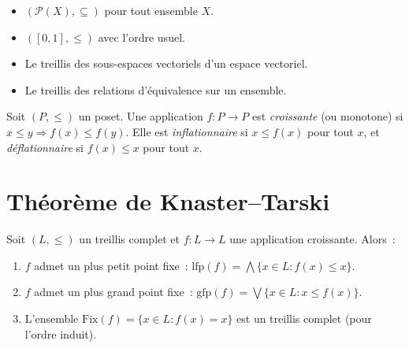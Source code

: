 \begin{exemple}
\begin{itemize}
  \item $(\mathcal{P}(X), \subseteq)$ pour tout ensemble $X$.
  \item $([0,1], \leq)$ avec l'ordre usuel.
  \item Le treillis des sous-espaces vectoriels d'un espace vectoriel.
  \item Le treillis des relations d'\'equivalence sur un ensemble.
\end{itemize}
\end{exemple}

\begin{definition}
Soit $(P, \leq)$ un poset. Une application $f\colon P \to P$ est \emph{croissante}
(ou monotone) si $x \leq y \Rightarrow f(x) \leq f(y)$. Elle est \emph{inflationnaire}
si $x \leq f(x)$ pour tout $x$, et \emph{d\'eflationnaire} si $f(x) \leq x$ pour tout $x$.
\end{definition}

\section{Th\'eor\`eme de Knaster--Tarski}

\begin{theoreme}
\label{thm:knaster-tarski}
Soit $(L, \leq)$ un treillis complet et $f\colon L \to L$ une application croissante.
Alors~:
\begin{enumerate}
  \item $f$ admet un plus petit point fixe~:
    $\mathrm{lfp}(f) = \bigwedge \{x \in L : f(x) \leq x\}$.
  \item $f$ admet un plus grand point fixe~:
    $\mathrm{gfp}(f) = \bigvee \{x \in L : x \leq f(x)\}$.
  \item L'ensemble $\mathrm{Fix}(f) = \{x \in L : f(x) = x\}$ est un treillis complet
    (pour l'ordre induit).
\end{enumerate}
\end{theoreme}

